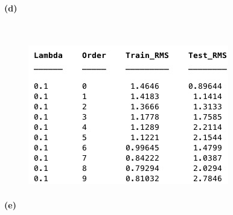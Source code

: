 \documentclass[]{article}
\begin{document}
	\paragraph{(d)}\mbox{}\\
	
	\begin{figure}[H]
		\centering
		\includegraphics[width=0.8\linewidth]{2d1}
		\caption{}
		\label{fig:2d1}
	\end{figure}
	
	\paragraph{(e)}\mbox{}\\
	
\end{document}
